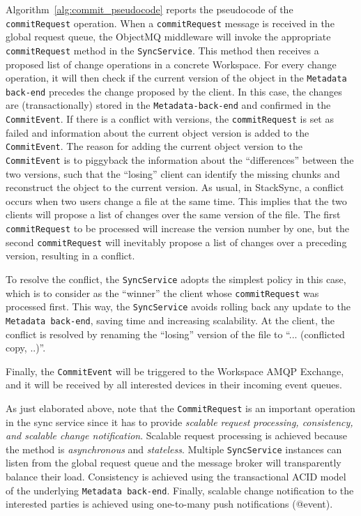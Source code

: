 Algorithm~\ref{alg:commit_pseudocode} reports the pseudocode of the \texttt{commitRequest} operation. When a \texttt{commitRequest} message is received in the global request queue, the ObjectMQ middleware will invoke the appropriate \texttt{commitRequest} method in the \texttt{SyncService}. 
This method then receives a proposed list of change operations in a concrete Workspace. For every change operation, it will then check if the current version of the object in the \texttt{Metadata back-end} precedes the change proposed by the client. In this case, the changes are (transactionally) stored in the \texttt{Metadata-back-end} and confirmed in the \texttt{CommitEvent}. If there is a conflict with versions, the \texttt{commitRequest} is set as failed and information about the current object version is added to the \texttt{CommitEvent}. The reason for adding the current object version to the \texttt{CommitEvent} is
to piggyback the information about the ``differences'' between the two versions, such that the ``losing'' client can identify the missing chunks and
reconstruct the object to the current version. 
As usual, in StackSync, a conflict occurs when two users change a file at the same time. This implies that the two clients
will propose a list of changes over the same version of the file. The first \texttt{commitRequest} to be processed will
increase the version number by one, but the second \texttt{commitRequest} will inevitably propose a list of changes over
a preceding version, resulting in a conflict. 

To resolve the conflict, the \texttt{SyncService} adopts the simplest policy in this case, which is to consider as 
the ``winner''  the client whose \texttt{commitRequest} was processed first. This way, the \texttt{SyncService}
avoids rolling back any update to the \texttt{Metadata back-end}, saving time and increasing scalability. At the client,
the conflict is resolved by renaming the ``losing'' version of the file to ``... (conflicted copy, ..)''.

Finally, the \texttt{CommitEvent} will be triggered to the Workspace AMQP Exchange, and 
it will be received by all interested devices in their incoming event queues. 

As just elaborated above, note that the \texttt{CommitRequest} is an important operation in the sync service since it has to provide \textit{scalable request processing, consistency, and scalable change notification}.  Scalable request processing is achieved because the method is \textit{asynchronous} and \textit{stateless}. Multiple \texttt{SyncService} instances can listen from the global request queue and the message broker will transparently
balance their load. Consistency is achieved using the transactional  ACID model of the underlying \texttt{Metadata back-end}. 
Finally, scalable change notification to the interested parties is achieved using one-to-many push notifications (@event).

